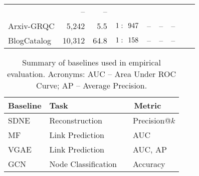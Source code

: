 \documentclass[letterpaper, conference]{IEEEtran}
\begin{document}
\begin{table}[ht]
\begin{center}
\begin{adjustbox}{width=0.5\textwidth}
\begin{tabular} {l  r  r  r  r  r  r  r  r}
				 & --
				 & -- \\
    Arxiv-GRQC
    		    & 5,242
                & 5.5
                & $1: \hspace{4.5pt} 947$
                & --
                & --
                & -- \\
	BlogCatalog
    		    & 10,312
                & 64.8
                & $1: \hspace{4.5pt} 158$
                & --
                & --
                & -- \\
	\hline
	\end{tabular}
	\label{tab1}
\end{adjustbox}
\end{center}
\end{table}

\begin{table}[ht]
\begin{center}
\caption[Caption for Table 2]{Summary of baselines used in empirical evaluation. Acronyms: AUC -- Area Under ROC Curve; AP -- Average Precision.}
\begin{adjustbox}{width=0.5\textwidth}
	\begin{tabular} {l  l  l}
	\hline
	\multicolumn{1}{l}{\multirow{1}{*}{\textbf{Baseline}}} &
	\multicolumn{1}{l}{\multirow{1}{*}{\textbf{Task}}} &
	\multicolumn{1}{l}{\multirow{1}{*}{\textbf{~~Metric}}} \\ \hline \hline
    SDNE \cite{Wang:2016} ~
							& Reconstruction
							& ~~Precision@$k$ \\
    MF \cite{Menon:2011} ~
					& Link Prediction
					 & ~~AUC \\
    VGAE \cite{VGAE:2016} ~
				& Link Prediction
				 & ~~AUC, AP \\
    GCN \cite{Kipf:2016} ~
						& Node Classification
				 		& ~~Accuracy \\
	\hline
	\end{tabular}
	\label{tab2}
\end{adjustbox}
\end{center}
\end{table}
\end{document}
